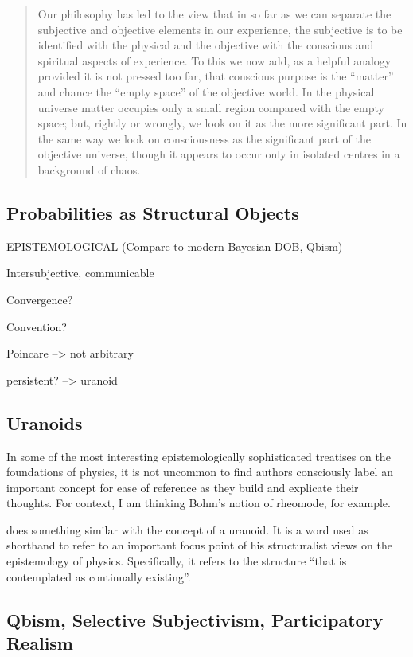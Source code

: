 \begin{quote}
    Our philosophy has led to the view that in so far as we can separate the subjective and objective elements in our experience, the subjective is to be identified with the physical and the objective with the conscious and spiritual aspects of experience.  To this we now add, as a helpful analogy provided it is not pressed too far, that conscious purpose is the ``matter'' and chance the ``empty space'' of the objective world.  In the physical universe matter occupies only a small region compared with the empty space; but, rightly or wrongly, we look on it as the more significant part.  In the same way we look on consciousness as the significant part of the objective universe, though it appears to occur only in isolated centres in a background of chaos.  \citep[p. 180-184]{Eddington1939}
\end{quote}

\subsection{Probabilities as Structural Objects}

EPISTEMOLOGICAL (Compare to modern Bayesian DOB, Qbism)

Intersubjective, communicable

Convergence?

Convention?

Poincare --> not arbitrary

persistent?  --> uranoid

\subsection{Uranoids}

In some of the most interesting epistemologically sophisticated treatises on the foundations of physics, it is not uncommon to find authors consciously label an important concept for ease of reference as they build and explicate their thoughts.  For context, I am thinking Bohm's notion of rheomode, for example.

\cite{Eddington1939} does something similar with the concept of a uranoid.  It is a word used as shorthand to refer to an important focus point of his structuralist views on the epistemology of physics.  Specifically, it refers to the structure ``that is contemplated as continually existing''.  \citep[p. 166]{Eddington1939}

\subsection{Qbism, Selective Subjectivism, Participatory Realism}

